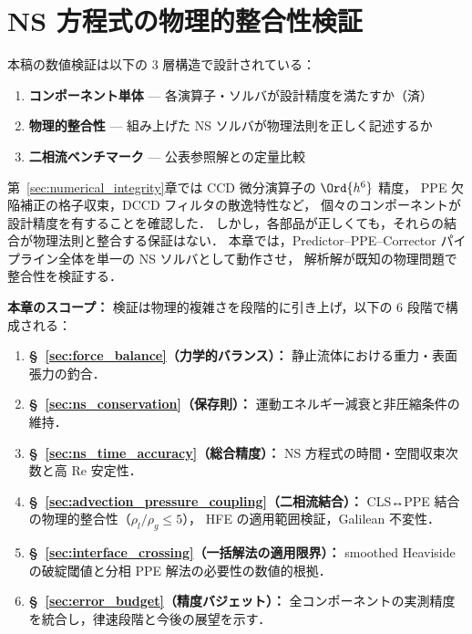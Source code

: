 %
%
\section{NS 方程式の物理的整合性検証}
\label{sec:verification}%
\label{sec:grid_convergence}%

本稿の数値検証は以下の 3 層構造で設計されている：
\begin{enumerate}[noitemsep]
  \item[\textbf{第~\ref{sec:numerical_integrity}章}]
    \textbf{コンポーネント単体} — 各演算子・ソルバが設計精度を満たすか（済）
  \item[\textbf{本章}]
    \textbf{物理的整合性} — 組み上げた NS ソルバが物理法則を正しく記述するか
  \item[\textbf{第~\ref{sec:validation}章}]
    \textbf{二相流ベンチマーク} — 公表参照解との定量比較
\end{enumerate}
第~\ref{sec:numerical_integrity}章では CCD 微分演算子の $\Ord{h^6}$ 精度，
PPE 欠陥補正の格子収束，DCCD フィルタの散逸特性など，
個々のコンポーネントが設計精度を有することを確認した．
しかし，各部品が正しくても，それらの結合が物理法則と整合する保証はない．
本章では，Predictor--PPE--Corrector パイプライン全体を単一の NS ソルバとして動作させ，
解析解が既知の物理問題で整合性を検証する．

\noindent\textbf{本章のスコープ：}
検証は物理的複雑さを段階的に引き上げ，以下の 6 段階で構成される：
\begin{enumerate}[noitemsep]
  \item \textbf{§~\ref{sec:force_balance}（力学的バランス）：}
        静止流体における重力・表面張力の釣合．
  \item \textbf{§~\ref{sec:ns_conservation}（保存則）：}
        運動エネルギー減衰と非圧縮条件の維持．
  \item \textbf{§~\ref{sec:ns_time_accuracy}（総合精度）：}
        NS 方程式の時間・空間収束次数と高 Re 安定性．
  \item \textbf{§~\ref{sec:advection_pressure_coupling}（二相流結合）：}
        CLS↔PPE 結合の物理的整合性（$\rho_l/\rho_g \leq 5$），
        HFE の適用範囲検証，Galilean 不変性．
  \item \textbf{§~\ref{sec:interface_crossing}（一括解法の適用限界）：}
        smoothed Heaviside の破綻閾値と分相 PPE 解法の必要性の数値的根拠．
  \item \textbf{§~\ref{sec:error_budget}（精度バジェット）：}
        全コンポーネントの実測精度を統合し，律速段階と今後の展望を示す．
\end{enumerate}

